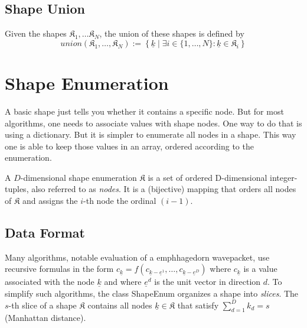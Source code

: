 \documentclass{article}
\begin{document}
\subsection{Shape Union}

\begin{definition}
  Given the shapes \( \mathfrak{K}_1, \ldots \mathfrak{K}_N \),
  the union of these shapes is defined by
  \begin{equation}
    union(\mathfrak{K}_1,\ldots,\mathfrak{K}_N) := \left\{ 
      \underline{k} \mid \exists i \in \{1, \ldots, N \} \colon \underline{k} \in \mathfrak{K}_i\right\}
  \end{equation}
\end{definition}

\section{Shape Enumeration}

A basic shape just tells you whether it contains a specific node. But
for most algorithms, one needs to associate values with shape
nodes. One way to do that is using a dictionary. But it is simpler to
enumerate all nodes in a shape.  This way one is able to keep those
values in an array, ordered according to the enumeration.

\begin{definition}
  A \( D \)-dimensional
  shape enumeration \( \mathfrak{K} \)
  is a set of ordered D-dimensional integer-tuples, also referred to
  as \emph{nodes}. It is a (bijective) mapping that orders all nodes
  of \( \mathfrak{K} \)
  and assigns the \(i\)-th node the ordinal \( (i-1) \).
\end{definition}

\subsection{Data Format}
Many algorithms, notable evaluation of a emph{hagedorn wavepacket},
use recursive formulas in the form
\( c_{\underline{k}} = f(c_{\underline{k}-\underline{e}^1}, \ldots,
c_{\underline{k}-\underline{e}^D}) \)
where \( c_{\underline{k}} \)
is a value associated with the node \( \underline{k} \)
and where \( \underline{e}^d \)
is the unit vector in direction \( d \).
To simplify such algorithms, the class ShapeEnum organizes a shape
into \emph{slices}.  The \( s \)-th
slice of a shape \( \mathfrak{K} \)
contains all nodes \( \underline{k} \in \mathfrak{K} \)
that satisfy \( \sum_{d=1}^{D} k_d = s \) (Manhattan distance).
\end{document}
